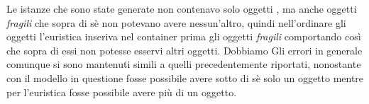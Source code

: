 Le istanze che sono state generate non contenavo solo oggetti , ma anche oggetti \textit{fragili} che sopra di sè non potevano avere nessun'altro, quindi nell'ordinare gli oggetti l'euristica inseriva nel container prima gli oggetti \textit{fragili} comportando così che sopra di essi non potesse esservi altri oggetti. Dobbiamo Gli errori in generale comunque si sono mantenuti simili a quelli precedentemente riportati, nonostante con il modello in questione fosse possibile avere sotto di sè solo un oggetto mentre per l'euristica fosse possibile avere più di un oggetto.